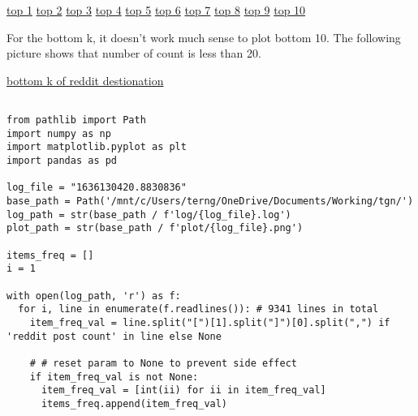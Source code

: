 \documentclass[11pt]{article}
\begin{document}
\begin{enumerate}
\href{file:///mnt/c/Users/terng/OneDrive/Documents/Working/tgn/plot/1636130420.8830836-destinations=top1.png}{top 1}
\href{file:///mnt/c/Users/terng/OneDrive/Documents/Working/tgn/plot/1636130420.8830836-destinations=top2.png}{top 2}
\href{file:///mnt/c/Users/terng/OneDrive/Documents/Working/tgn/plot/1636130420.8830836-destinations=top3.png}{top 3}
\href{file:///mnt/c/Users/terng/OneDrive/Documents/Working/tgn/plot/1636130420.8830836-destinations=top4.png}{top 4}
\href{file:///mnt/c/Users/terng/OneDrive/Documents/Working/tgn/plot/1636130420.8830836-destinations=top5.png}{top 5}
\href{file:///mnt/c/Users/terng/OneDrive/Documents/Working/tgn/plot/1636130420.8830836-destinations=top6.png}{top 6}
\href{file:///mnt/c/Users/terng/OneDrive/Documents/Working/tgn/plot/1636130420.8830836-destinations=top7.png}{top 7}
\href{file:///mnt/c/Users/terng/OneDrive/Documents/Working/tgn/plot/1636130420.8830836-destinations=top8.png}{top 8}
\href{file:///mnt/c/Users/terng/OneDrive/Documents/Working/tgn/plot/1636130420.8830836-destinations=top9.png}{top 9}
\href{file:///mnt/c/Users/terng/OneDrive/Documents/Working/tgn/plot/1636130420.8830836-destinations=top10.png}{top 10}

For the bottom k, it doesn't work much sense to plot bottom 10.
The following picture shows that number of count is less than 20.


\href{file:///mnt/c/Users/terng/OneDrive/Documents/Working/tgn/references/bottom k from frequency table of reddit destination.PNG}{bottom k of reddit destionation}

\begin{verbatim}

from pathlib import Path
import numpy as np
import matplotlib.pyplot as plt
import pandas as pd

log_file = "1636130420.8830836"
base_path = Path('/mnt/c/Users/terng/OneDrive/Documents/Working/tgn/')
log_path = str(base_path / f'log/{log_file}.log')
plot_path = str(base_path / f'plot/{log_file}.png')

items_freq = []
i = 1

with open(log_path, 'r') as f:
  for i, line in enumerate(f.readlines()): # 9341 lines in total
    item_freq_val = line.split("[")[1].split("]")[0].split(",") if 'reddit post count' in line else None

    # # reset param to None to prevent side effect
    if item_freq_val is not None:
      item_freq_val = [int(ii) for ii in item_freq_val]
      items_freq.append(item_freq_val)




\end{verbatim}
\end{enumerate}
\end{document}
